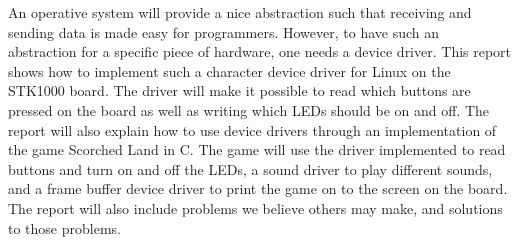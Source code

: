 An operative system will provide a nice abstraction such that receiving
and sending data is made easy for programmers. However, to have such an
abstraction for a specific piece of hardware, one needs a device driver.
This report shows how to implement such a character device driver for
Linux on the STK1000 board. The driver will make it possible to read
which buttons are pressed on the board as well as writing which LEDs
should be on and off. The report will also explain how to use device
drivers through an implementation of the game Scorched Land in C. The
game will use the driver implemented to read buttons and turn on and off
the LEDs, a sound driver to play different sounds, and a frame buffer
device driver to print the game on to the screen on the board. The
report will also include problems we believe others may make, and
solutions to those problems.

